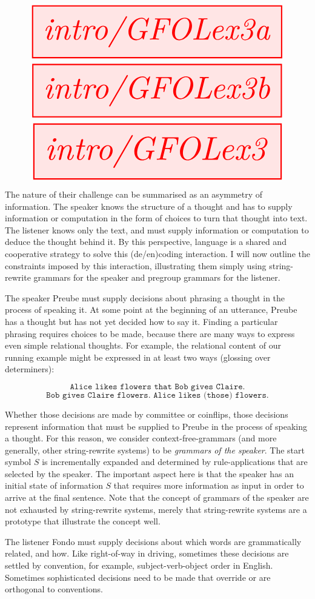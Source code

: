 \begin{fullwidth}
\begin{example}
\[\resizebox{\textwidth}{!}{\tikzfig{intro/GFOLex3a}}\]
\[\resizebox{\textwidth}{!}{\tikzfig{intro/GFOLex3b}}\]
\[\resizebox{\textwidth}{!}{\tikzfig{intro/GFOLex3}}\]
\end{example}

The nature of their challenge can be summarised as an asymmetry of information. The speaker knows the structure of a thought and has to supply information or computation in the form of choices to turn that thought into text. The listener knows only the text, and must supply information or computation to deduce the thought behind it. By this perspective, language is a shared and cooperative strategy to solve this (de/en)coding interaction. I will now outline the constraints imposed by this interaction, illustrating them simply using string-rewrite grammars for the speaker and pregroup grammars for the listener.

 The speaker Preube must supply decisions about phrasing a thought in the process of speaking it. At some point at the beginning of an utterance, Preube has a thought but has not yet decided how to say it. Finding a particular phrasing requires choices to be made, because there are many ways to express even simple relational thoughts. For example, the relational content of our running example might be expressed in at least two ways (glossing over determiners):

\[\texttt{Alice likes flowers that Bob gives Claire.}\]
\[\texttt{Bob gives Claire flowers. Alice likes (those) flowers.}\]

Whether those decisions are made by committee or coinflips, those decisions represent information that must be supplied to Preube in the process of speaking a thought. For this reason, we consider context-free-grammars (and more generally, other string-rewrite systems) to be \emph{grammars of the speaker}. The start symbol $S$ is incrementally expanded and determined by rule-applications that are selected by the speaker. The important aspect here is that the speaker has an initial state of information $S$ that requires more information as input in order to arrive at the final sentence. Note that the concept of grammars of the speaker are not exhausted by string-rewrite systems, merely that string-rewrite systems are a prototype that illustrate the concept well.

 The listener Fondo must supply decisions about which words are grammatically related, and how. Like right-of-way in driving, sometimes these decisions are settled by convention, for example, subject-verb-object order in English. Sometimes sophisticated decisions need to be made that override or are orthogonal to conventions.


\end{fullwidth}
